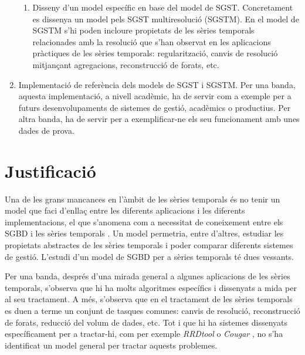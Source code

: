\begin{enumerate}
\begin{enumerate}
  \item Disseny d'un model específic en base del model de
    SGST. Concretament es dissenya un model pels SGST multiresolució
    (SGSTM).  En el model de SGSTM s'hi poden incloure propietats de
    les sèries temporals relacionades amb la resolució que s'han
    observat en les aplicacions pràctiques de les sèries temporals:
    regularització, canvis de resolució mitjançant agregacions,
    reconstrucció de forats, etc.
  \end{enumerate}

\item Implementació de referència dels models de SGST i SGSTM. Per una
  banda, aquesta implementació, a nivell acadèmic, ha de servir com a
  exemple per a futurs desenvolupaments de sistemes de gestió,
  acadèmics o productius. Per altra banda, ha de servir per a
  exemplificar-ne els seu funcionament amb unes dades de prova.



\end{enumerate} 






\section{Justificació}

Una de les grans mancances en l'àmbit de les sèries temporals és no
tenir un model que faci d'enllaç entre les diferents aplicacions i les
diferents implementacions, el que s'anomena com a necessitat de
coneixement entre els SGBD i les sèries
temporals \parencite{zhang11,stonebraker09:scidb}. Un model permetria,
entre d'altres, estudiar les propietats abstractes de les sèries
temporals i poder comparar diferents sistemes de gestió.
L'estudi d'un model de SGBD per a sèries temporals té dues vessants.


Per una banda, després d'una mirada general a algunes aplicacions de
les sèries temporals, s'observa que hi ha molts algoritmes específics
i dissenyats a mida per al seu tractament. A més, s'observa que en el
tractament de les sèries temporals es duen a terme un conjunt de
tasques comunes: canvis de resolució, reconstrucció de forats,
reducció del volum de dades, etc.  Tot i que hi ha sistemes dissenyats
específicament per a tractar-hi, com per exemple
\emph{RRDtool} \parencite{rrdtool} o \emph{Cougar} \parencite{fung02},
no s'ha identificat un model general per tractar aquests problemes.

